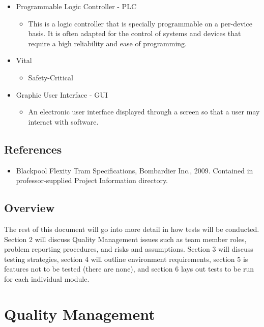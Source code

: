 \documentclass{article}
\begin{document}
\begin{itemize}
        \item Programmable Logic Controller - PLC
            \begin{itemize}
            \item This is a logic controller that is specially programmable on a per-device basis. It is often adapted for the control of systems and devices that require a high reliability and ease of programming.
            \end{itemize}
        \item Vital
            \begin{itemize}
            \item Safety-Critical
            \end{itemize}
        \item Graphic User Interface - GUI
            \begin{itemize}
                \item An electronic user interface displayed through a screen so that a user may interact with software.
            \end{itemize}
    \end{itemize}
    
    \subsection{References}
    \begin{itemize}
        \item Blackpool Flexity Tram Specifications, Bombardier Inc., 2009. Contained in professor-supplied Project Information directory.
    \end{itemize}
    
    \subsection{Overview}
    \parargraph{}
    The rest of this document will go into more detail in how tests will be conducted. Section 2 will discuss Quality Management issues such as team member roles, problem reporting procedures, and risks and assumptions. Section 3 will discuss testing strategies, section 4 will outline environment requirements, section 5 is features not to be tested (there are none), and section 6 lays out tests to be run for each individual module.

\section{Quality Management}
\end{document}
